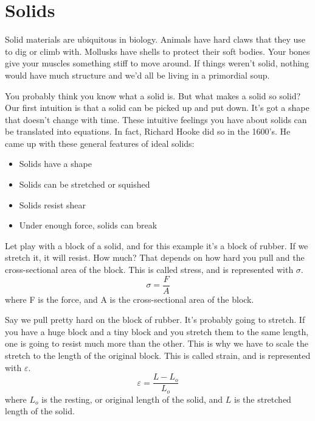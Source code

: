 


\chapter{Solids}
\label{ch:Solids}
Solid materials are ubiquitous in biology. Animals have hard claws that they use to dig or climb with. Mollusks have shells to protect their soft bodies. Your bones give your muscles something stiff to move around. If things weren't solid, nothing would have much structure and we'd all be living in a primordial soup.

You probably think you know what a solid is. But what makes a solid so solid?Our first intuition is that a solid can be picked up and put down. It's got a shape that doesn't change with time. These intuitive feelings you have about solids can be translated into equations. In fact, Richard Hooke did so in the 1600's. He came up with these general features of ideal solids: 

\begin{itemize}
\item Solids have a shape
\item Solids can be stretched or squished
\item Solids resist shear
\item Under enough force, solids can break
\end{itemize}

Let play with a block of a solid, and for this example it's a block of rubber. If we stretch it, it will resist. How much? That depends on how hard you pull and the cross-sectional area of the block. This is called stress, and is represented with $\sigma$.
\begin{equation}
\sigma = \frac{F}{A}
\end{equation}
where F is the force, and A is the cross-sectional area of the block.

Say we pull pretty hard on the block of rubber. It's probably going to stretch. If you have a huge block and a tiny block and you stretch them to the same length, one is going to resist much more than the other. This is why we have to scale the stretch to the length of the original block. This is called strain, and is represented with $\varepsilon$.
\begin{equation}
\varepsilon = \frac{L-L_o}{L_o}
\end{equation}
where $L_o$ is the resting, or original length of the solid, and $L$ is the stretched length of the solid.

